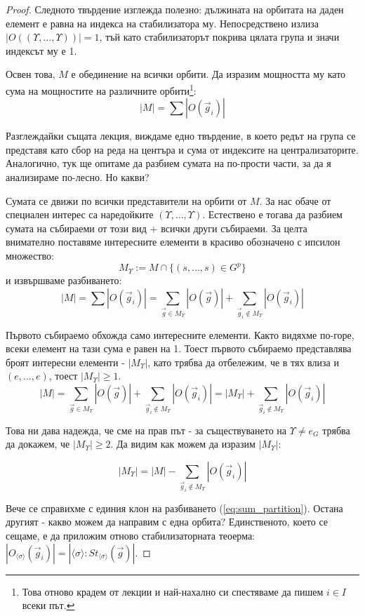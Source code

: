 \documentclass{article}
\newcommand{\grsigma}[0]{{\langle \sigma \rangle}}
\begin{document}
\begin{proof}
    Следното твърдение изглежда полезно: дължината на орбитата на даден елемент е равна на индекса на стабилизатора му.
    Непосредствено излиза $|O((\Upsilon,\dots,\Upsilon))| = 1$, тъй като стабилизаторът покрива цялата група и значи индексът му е 1.

    Освен това, $M$ е обединение на всички орбити.
    Да изразим мощността му като сума на мощностите на различните орбити\footnote{Това отново крадем от лекции и най-нахално си спестяваме да пишем $i\in I$ всеки път.}:
    $$|M| = \sum |O(\vec g_i)|$$

    \newcommand{\gunint}{{\vec g_i \not\in M_\Upsilon}}

    Разглеждайки същата лекция, виждаме едно твърдение, в което редът на група се представя като сбор на реда на центъра и сума от индексите на централизаторите.
    Аналогично, тук ще опитаме да разбием сумата на по-прости части, за да я анализираме по-лесно. Но какви?

    Сумата се движи по всички представители на орбити от $M$. За нас обаче от специален интерес са наредойките $(\Upsilon,\dots,\Upsilon)$.
    Естествено е тогава да разбием сумата на събираеми от този вид $+$ всички други събираеми.
    За целта внимателно поставяме интересните елементи в красиво обозначено с ипсилон множество:
    $$M_\Upsilon := M \cap \{(s,\dots,s) \in G^p\}$$
    и извършваме разбиването:
    \begin{equation}
        \label{eq:sum_partition}
        |M| = \sum |O(\vec g_i)| = \sum_{\vec g \in M_\Upsilon} |O(\vec g)| + \sum_{\gunint} |O(\vec g_i)|
    \end{equation}

    Първото събираемо обхожда само интересните елементи.
    Както видяхме по-горе, всеки елемент на тази сума е равен на 1.
    Тоест първото събираемо представлява броят интересни елементи - $|M_\Upsilon|$, като трябва да отбележим, че в тях влиза и $(e, \dots, e)$, тоест $|M_\Upsilon| \ge 1$.
    $$|M| = \sum_{\vec g \in M_\Upsilon} |O(\vec g)| + \sum_{\gunint} |O(\vec g_i)|=|M_\Upsilon| + \sum_{\gunint} |O(\vec g_i)|$$

    Това ни дава надежда, че сме на прав път - за съществуването на $\Upsilon \not= e_G$ трябва да докажем, че $|M_\Upsilon|\ge 2$.
    Да видим как можем да изразим $|M_\Upsilon|$:

    $$|M_\Upsilon| = |M| - \sum_{\gunint} |O(\vec g_i)|$$

    Вече се справихме с единия клон на разбиването (\ref{eq:sum_partition}).
    Остана другият - какво можем да направим с една орбита?
    Единственото, което се сещаме, е да приложим отново стабилизаторната теоерма:
    ${|O_{\grsigma}(\vec g_i)| = |\grsigma:St_{\grsigma}(\vec g)|}$.


\end{proof}
\end{document}
